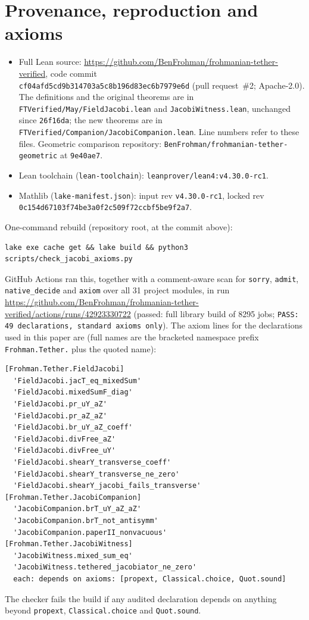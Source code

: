 \documentclass[11pt]{article}\emergencystretch=2em
\theoremstyle{definition}\newtheorem{definition}[theorem]{Definition}\theoremstyle{remark}\newtheorem{remark}[theorem]{Remark}
\begin{document}
\section{Provenance, reproduction and axioms}
\begin{itemize}
\item Full Lean source: \url{https://github.com/BenFrohman/frohmanian-tether-verified}, code commit\\ \nolinkurl{cf04afd5cd9b314703a5c8b196d83ec6b7979e6d} (pull request~\#2; Apache-2.0). The definitions and the original theorems are in \nolinkurl{FTVerified/May/FieldJacobi.lean} and \nolinkurl{JacobiWitness.lean}, unchanged since \texttt{26f16da}; the new theorems are in \nolinkurl{FTVerified/Companion/JacobiCompanion.lean}. Line numbers refer to these files. Geometric comparison repository: \texttt{BenFrohman/frohmanian-tether-geometric} at \texttt{9e40ae7}.
\item Lean toolchain (\texttt{lean-toolchain}): \texttt{leanprover/lean4:v4.30.0-rc1}.
\item Mathlib (\texttt{lake-manifest.json}): input rev \texttt{v4.30.0-rc1}, locked rev\\ \texttt{0c154d67103f74be3a0f2c509f72ccbf5be9f2a7}.
\end{itemize}
One-command rebuild (repository root, at the commit above):
\begin{verbatim}
lake exe cache get && lake build && python3 scripts/check_jacobi_axioms.py
\end{verbatim}
GitHub Actions ran this, together with a comment-aware scan for \texttt{sorry}, \texttt{admit}, \texttt{native\_decide} and \texttt{axiom} over all 31 project modules, in run\\ \url{https://github.com/BenFrohman/frohmanian-tether-verified/actions/runs/42923330722} (passed: full library build of 8295 jobs; \texttt{PASS: 49 declarations, standard axioms only}). The axiom lines for the declarations used in this paper are (full names are the bracketed namespace prefix \texttt{Frohman.Tether.} plus the quoted name):
{\footnotesize\begin{verbatim}
[Frohman.Tether.FieldJacobi]
  'FieldJacobi.jacT_eq_mixedSum'
  'FieldJacobi.mixedSumF_diag'
  'FieldJacobi.pr_uY_aZ'
  'FieldJacobi.pr_aZ_aZ'
  'FieldJacobi.br_uY_aZ_coeff'
  'FieldJacobi.divFree_aZ'
  'FieldJacobi.divFree_uY'
  'FieldJacobi.shearY_transverse_coeff'
  'FieldJacobi.shearY_transverse_ne_zero'
  'FieldJacobi.shearY_jacobi_fails_transverse'
[Frohman.Tether.JacobiCompanion]
  'JacobiCompanion.brT_uY_aZ_aZ'
  'JacobiCompanion.brT_not_antisymm'
  'JacobiCompanion.paperII_nonvacuous'
[Frohman.Tether.JacobiWitness]
  'JacobiWitness.mixed_sum_eq'
  'JacobiWitness.tethered_jacobiator_ne_zero'
  each: depends on axioms: [propext, Classical.choice, Quot.sound]
\end{verbatim}}
\noindent The checker fails the build if any audited declaration depends on anything beyond \texttt{propext}, \texttt{Classical.choice} and \texttt{Quot.sound}.
\end{document}
